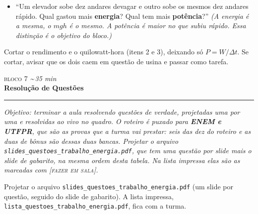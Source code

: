 \documentclass[11pt,a4paper]{article}
\newcommand{\bloco}[3]{%
  \needspace{7\baselineskip}
  \vspace{1.8em}
  {\scshape\color{vinho}bloco #1}\hfill
    {\small\itshape\color{grafite}\textasciitilde\,#3 min}\\[0.1em]
  {\Large\bfseries #2}\\[-0.55em]
  {\color{black!30}\rule{\linewidth}{0.5pt}}
  \par\nobreak\smallskip
}
\newcommand{\objetivo}[1]{{\itshape\color{grafite}Objetivo: #1}\par\smallskip}
\begin{document}
\begin{perguntas}
\begin{itemize}[nosep]
  \item ``Um elevador sobe dez andares devagar e outro sobe os mesmos
        dez andares r\'apido. Qual gastou mais \textbf{energia}? Qual
        tem mais \textbf{pot\^encia}?''
        \textit{(A energia \'e a mesma, o $mgh$ \'e o mesmo. A
        pot\^encia \'e maior no que subiu r\'apido. Essa
        distin\c{c}\~ao \'e o objetivo do bloco.)}
\end{itemize}
\end{perguntas}

\begin{corte}
Cortar o rendimento e o quilowatt-hora (itens 2 e 3), deixando s\'o
$P = W/\Delta t$. Se cortar, avisar que os dois caem em quest\~ao de
usina e passar como tarefa.
\end{corte}

\bloco{7}{Resolu\c{c}\~ao de Quest\~oes}{35}

\objetivo{terminar a aula resolvendo quest\~oes de verdade,
projetadas uma por uma e resolvidas ao vivo no quadro. O roteiro
\'e puxado para \textbf{ENEM e UTFPR}, que s\~ao as provas que a
turma vai prestar: seis das dez do roteiro e as duas de b\^onus
s\~ao dessas duas bancas. Projetar o arquivo
\texttt{slides\_questoes\_\allowbreak trabalho\_\allowbreak energia.pdf},
que tem uma quest\~ao por slide mais o slide de gabarito, na mesma
ordem desta tabela. Na lista impressa elas s\~ao as marcadas com
{\scshape\color{vinho}[fazer em sala]}.}

\begin{projetor}
Projetar o arquivo
\texttt{slides\_questoes\_\allowbreak trabalho\_\allowbreak energia.pdf}
(um slide por quest\~ao, seguido do slide de gabarito). A lista
impressa,
\texttt{lista\_questoes\_\allowbreak trabalho\_\allowbreak energia.pdf},
fica com a turma.

\smallskip
\end{projetor}
\end{document}
